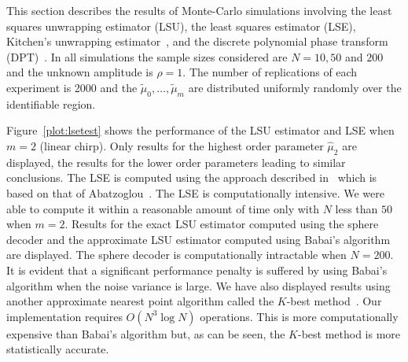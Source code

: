 \documentclass[journal]{IEEEtran}
\begin{document}
This section describes the results of Monte-Carlo simulations involving the least squares unwrapping estimator (LSU), the least squares estimator (LSE), Kitchen's unwrapping estimator~\cite{Kitchen_polyphase_unwrapping_1994}, and the discrete polynomial phase transform (DPT)~\cite{Peleg_DPT_1995}.  In all simulations the sample sizes considered are $N = 10, 50$ and $200$ and the unknown amplitude is $\rho = 1$.  The number of replications of each experiment is 2000 and the $\tilde{\mu}_0, \dots, \tilde{\mu}_m$ are distributed uniformly randomly over the identifiable region.
 
Figure~\ref{plot:lsetest} shows the performance of the LSU estimator and LSE when $m=2$ (linear chirp). Only results for the highest order parameter $\widehat{\mu}_2$ are displayed, the results for the lower order parameters leading to similar conclusions.  The LSE is computed using the approach described in~\cite[Sec.~10.1]{McKilliam2010thesis} which is based on that of Abatzoglou~\cite{Abatzoglou_ml_chirp_1986}. The LSE is computationally intensive.  We were able to compute it within a reasonable amount of time only with $N$ less than $50$ when $m=2$. Results for the exact LSU estimator computed using the sphere decoder and the approximate LSU estimator computed using Babai's algorithm are displayed. The sphere decoder is computationally intractable when $N = 200$. It is evident that a significant performance penalty is suffered by using Babai's algorithm when the noise variance is large.  We have also displayed results using another approximate nearest point algorithm called the $K$-best method~\cite{Zhan2006_K_best_sphere_decoder}. Our implementation requires $O(N^3\log{N})$ operations. This is more computationally expensive than Babai's algorithm but, as can be seen, the $K$-best method is more statistically accurate.
\end{document}
